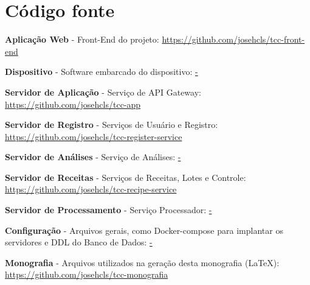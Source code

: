 \chapter{Código fonte}



\textbf{Aplicação Web} - Front-End do projeto: \url{https://github.com/josehcls/tcc-front-end}


\textbf{Dispositivo} - Software embarcado do dispositivo: \url{-}


\textbf{Servidor de Aplicação} - Serviço de API Gateway: \url{https://github.com/josehcls/tcc-app}


\textbf{Servidor de Registro} - Serviços de Usuário e Registro: \url{https://github.com/josehcls/tcc-register-service}


\textbf{Servidor de Análises} - Serviço de Análises: \url{-}


\textbf{Servidor de Receitas} - Serviços de Receitas, Lotes e Controle: \url{https://github.com/josehcls/tcc-recipe-service}


\textbf{Servidor de Processamento} - Serviço Processador: \url{-}


\textbf{Configuração} - Arquivos gerais, como Docker-compose para implantar os servidores e DDL do Banco de Dados: \url{-}


\textbf{Monografia} - Arquivos utilizados na geração desta monografia (LaTeX): \url{https://github.com/josehcls/tcc-monografia}

